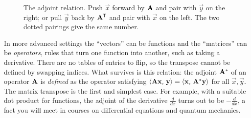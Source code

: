 \begin{figure}[H]
\centering
{}
\caption{The adjoint relation. Push $\vec{x}$ forward by $\mathbf{A}$ and pair with $\vec{y}$ on the
right; or pull $\vec{y}$ back by $\mathbf{A}^{\mathsf{T}}$ and pair with $\vec{x}$ on the left. The two dotted
pairings give the same number.}
\label{ch10:fig-adjoint}
\end{figure}

\begin{aestheticbox}
In more advanced settings the ``vectors'' can be functions and the ``matrices'' can be
\emph{operators}, rules that turn one function into another, such as taking a derivative. There are
no tables of entries to flip, so the transpose cannot be defined by swapping indices. What survives
is this relation: the adjoint $\mathbf{A}^{*}$ of an operator $\mathbf{A}$ is \emph{defined} as the
operator satisfying $\langle \mathbf{A}\mathbf{x},\, \mathbf{y} \rangle=\langle \mathbf{x},\, \mathbf{A}^{*}\mathbf{y} \rangle$ for all
$\vec{x},\vec{y}$. The matrix transpose is the first and simplest case. For example, with a suitable
dot product for functions, the adjoint of the derivative $\frac{d}{dx}$ turns out to be
$-\frac{d}{dx}$, a fact you will meet in courses on differential equations and quantum mechanics.
\end{aestheticbox}

